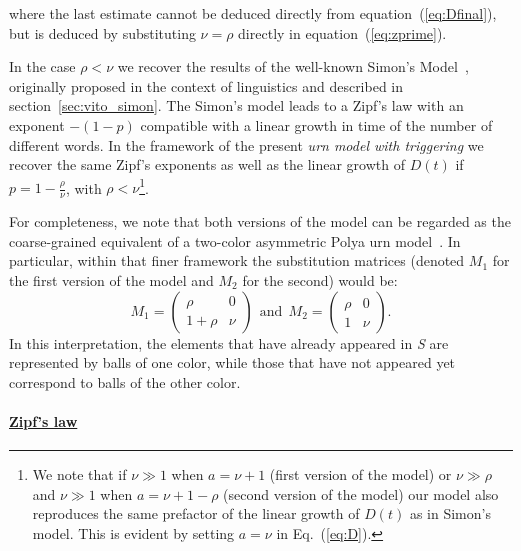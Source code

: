 \documentclass[graybox]{svmult}
\begin{document}
\noindent where the last estimate cannot be deduced directly from equation~(\ref{eq:Dfinal}), but is deduced by substituting $\nu=\rho$ directly in equation~(\ref{eq:zprime}).

In the case $\rho<\nu$ we recover the results of the well-known Simon's Model~\cite{simon-mandel-dispute}, originally proposed in the context of linguistics and described in section~\ref{sec:vito_simon}. The Simon's model leads to a Zipf's law with an exponent $-(1-p)$ compatible with a linear growth in time of the number of different words. In the framework of the present {\em urn model with triggering} we recover the same Zipf's exponents as well as the linear growth of $D(t)$ if $p=1-\frac{\rho}{\nu}$, with $\rho<\nu$\footnote{We note that if $\nu \gg 1$ when $a=\nu+1$ (first version of the model) or $\nu \gg \rho$ and $\nu \gg 1$ when $a=\nu+1-\rho$ (second version of the model) our model also reproduces the same prefactor of the linear growth of $D(t)$ as in Simon's model. This is evident by setting $a=\nu$ in Eq.~(\ref{eq:D}).}.

For completeness, we note that both versions of the model can be regarded as the coarse-grained  equivalent of a two-color asymmetric Polya urn model~\cite{mahmoud_polya}. In particular, within that finer framework the substitution matrices (denoted $M_1$ for the first version of the model and $M_2$ for the second) would be:
\[ 
	M_1=\left( \begin{array}{cc}
		\rho & 0 \\
		1+\rho & \nu \end{array} \right)
~~\mbox{and}~~ 
	M_2=\left( \begin{array}{cc}
		\rho & 0 \\
		1 & \nu \end{array} \right).
\] 
In this interpretation, the elements that have already appeared in {\em S} are represented by balls of one color, while those that have not appeared yet correspond to balls of the other color.

\paragraph{\underline{Zipf's law}}
\end{document}

